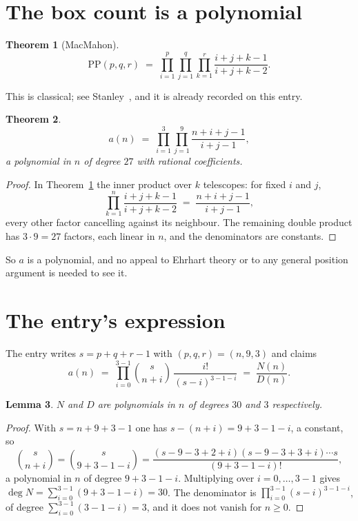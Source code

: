 \documentclass[11pt,a4paper]{article}
\theoremstyle{plain}
\newtheorem{theorem}{Theorem}
\newtheorem{lemma}[theorem]{Lemma}
\theoremstyle{definition}
\begin{document}
\section{The box count is a polynomial}

\begin{theorem}[MacMahon]\label{thm:mm}
\[
\mathrm{PP}(p,q,r)\;=\;\prod_{i=1}^{p}\prod_{j=1}^{q}\prod_{k=1}^{r}
\frac{i+j+k-1}{i+j+k-2} .
\]
\end{theorem}

This is classical; see Stanley~\cite{stanley}, and it is already recorded on this entry.

\begin{theorem}\label{thm:poly}
\[
a(n)\;=\;\prod_{i=1}^{3}\prod_{j=1}^{9}\frac{n+i+j-1}{i+j-1},
\]
a polynomial in $n$ of degree $27$ with rational coefficients.
\end{theorem}

\begin{proof}
In Theorem~\ref{thm:mm} the inner product over $k$ telescopes: for fixed $i$ and $j$,
\[
\prod_{k=1}^{n}\frac{i+j+k-1}{i+j+k-2}\;=\;\frac{n+i+j-1}{i+j-1} ,
\]
every other factor cancelling against its neighbour. The remaining double product has
$3\cdot9=27$ factors, each linear in $n$, and the denominators are constants.
\end{proof}

So $a$ is a polynomial, and no appeal to Ehrhart theory or to any general position argument is
needed to see it.

\section{The entry's expression}

The entry writes $s=p+q+r-1$ with $(p,q,r)=(n,9,3)$ and claims
\[
a(n)\;=\;\prod_{i=0}^{3-1}\binom{s}{n+i}\,\frac{i!}{(s-i)^{3-1-i}}\;=\;
\frac{N(n)}{D(n)} .
\]

\begin{lemma}\label{lem:deg}
$N$ and $D$ are polynomials in $n$ of degrees $30$ and $3$ respectively.
\end{lemma}

\begin{proof}
With $s=n+9+3-1$ one has $s-(n+i)=9+3-1-i$, a constant, so
\[
\binom{s}{n+i}=\binom{s}{9+3-1-i}
=\frac{(s-9-3+2+i)(s-9-3+3+i)\cdots s}{(9+3-1-i)!},
\]
a polynomial in $n$ of degree $9+3-1-i$. Multiplying over $i=0,\dots,3-1$ gives
$\deg N=\sum_{i=0}^{3-1}(9+3-1-i)=30$. The denominator is
$\prod_{i=0}^{3-1}(s-i)^{3-1-i}$, of degree
$\sum_{i=0}^{3-1}(3-1-i)=3$, and it does not vanish for $n\ge0$.
\end{proof}
\end{document}
